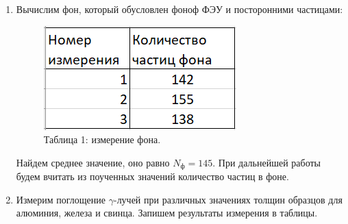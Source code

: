 \documentclass[a4paper, 12pt]{article}%
\begin{document}
	\begin{enumerate}
	\item Вычислим фон, который обусловлен фоноф ФЭУ и посторонними частицами:
	
		\begin{figure}[h!]
		\centering
		\includegraphics[width=0.3\linewidth]{images/table_1.png}
		\caption{Таблица 1: измерение фона.}
		\label{Table_1}
		\end{figure}
	
	Найдем среднее значение, оно равно $N_{\text{ф}} = 145$. При дальнейшей работы будем вчитать из поученных значений количество частиц в фоне.
	
	\item Измерим поглощение $\gamma$-лучей при различных значениях толщин образцов для алюминия, железа и свинца. Запишем результаты измерения в таблицы.
		

\end{enumerate}
\end{document}
